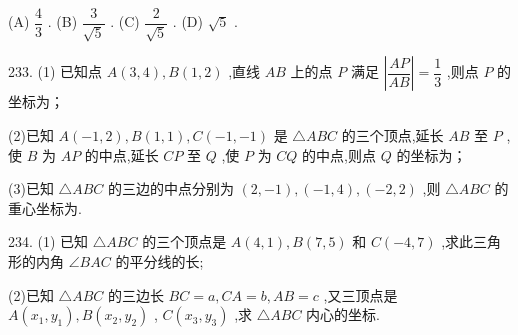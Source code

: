 (A) $\dfrac{4}{3}$ . (B) $\dfrac{3}{\sqrt{5}}$ . (C) $\dfrac{2}{\sqrt{5}}$ . (D) $\sqrt{5}$ .

233. (1) 已知点 $A\left( {3,4}\right) ,B\left( {1,2}\right)$ ,直线 ${AB}$ 上的点 $P$ 满足 $\left| \dfrac{AP}{AB}\right|  = \dfrac{1}{3}$ ,则点 $P$ 的坐标为\blkda{}；

(2)已知 $A\left( {-1,2}\right) ,B\left( {1,1}\right) ,C\left( {-1, - 1}\right)$ 是 $\bigtriangleup  {ABC}$ 的三个顶点,延长 ${AB}$ 至 $P$ ,使 $B$ 为 ${AP}$ 的中点,延长 ${CP}$ 至 $Q$ ,使 $P$ 为 ${CQ}$ 的中点,则点 $Q$ 的坐标为\blkda{}；

(3)已知 $\bigtriangleup  {ABC}$ 的三边的中点分别为 $\left( {2, - 1}\right) ,\left( {-1,4}\right) ,\left( {-2,2}\right)$ ,则 $\bigtriangleup  {ABC}$ 的重心坐标为\blkda{}.

234. (1) 已知 $\bigtriangleup {ABC}$ 的三个顶点是 $A\left( {4,1}\right) ,B\left( {7,5}\right)$ 和 $C\left( {-4,7}\right)$ ,求此三角形的内角 $\angle {BAC}$ 的平分线的长;

(2)已知 $\bigtriangleup  {ABC}$ 的三边长 ${BC} = a,{CA} = b,{AB} = c$ ,又三顶点是 $A\left( {{x}_{1},{y}_{1}}\right) ,B\left( {{x}_{2},{y}_{2}}\right)$ , $C\left( {{x}_{3},{y}_{3}}\right)$ ,求 $\bigtriangleup  {ABC}$ 内心的坐标.

